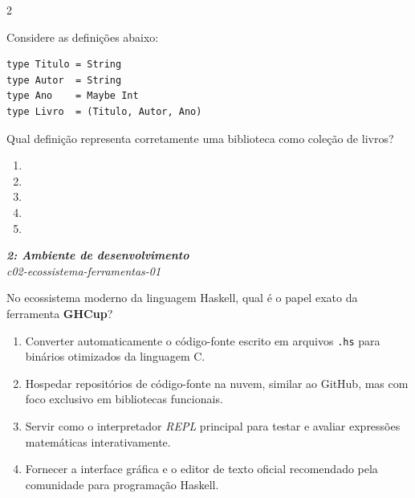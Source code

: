 \documentclass[a4paper,10pt,brazil]{article}
\begin{document}
\begin{multicols}{2}
\begin{flushright}
\end{flushright}
Considere as definições abaixo:
\begin{verbatim}
type Titulo = String
type Autor  = String
type Ano    = Maybe Int
type Livro  = (Titulo, Autor, Ano)
\end{verbatim}
Qual definição representa corretamente uma biblioteca como coleção de livros?

\begin{enumerate}
  \item {}

  \item {}

  \item {}

  \item {}

  \item {}


\end{enumerate}

\begin{flushright}
  \footnotesize
  \textit{\textbf{2: Ambiente de desenvolvimento}}\\
  \textit{c02-ecossistema-ferramentas-01}\\

\end{flushright}
No ecossistema moderno da linguagem Haskell, qual é o papel exato da ferramenta \textbf{GHCup}?

\begin{enumerate}
  \item Converter automaticamente o código-fonte escrito em arquivos \texttt{.hs} para binários otimizados da linguagem C.

  \item Hospedar repositórios de código-fonte na nuvem, similar ao GitHub, mas com foco exclusivo em bibliotecas funcionais.

  \item Servir como o interpretador \emph{REPL} principal para testar e avaliar expressões matemáticas interativamente.

  \item Fornecer a interface gráfica e o editor de texto oficial recomendado pela comunidade para programação Haskell.


\end{enumerate}
\end{multicols}
\end{document}
